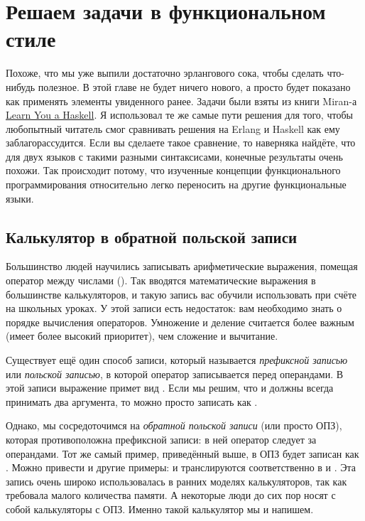 \chapter{Решаем задачи в функциональном стиле}
\label{functionally-solving-problems}
\colorbox{lgray}
{
\begin{minipage}{1.0\linewidth}
    Похоже, что мы уже выпили достаточно эрлангового сока, чтобы сделать что\--нибудь полезное.
    В этой главе не будет ничего нового, а просто будет показано как применять элементы увиденного ранее.
    Задачи были взяты из книги Miran\--а \href{http://learnyouahaskell.com/functionally-solving-problems}{Learn You a Haskell}.
    Я использовал те же самые пути решения для того, чтобы любопытный читатель смог сравнивать решения на Erlang и Haskell как ему заблагорассудится.
    Если вы сделаете такое сравнение, то наверняка найдёте, что для двух языков с такими разными синтаксисами, конечные результаты очень похожи.
    Так происходит потому, что изученные концепции функционального программирования относительно легко переносить на другие функциональные языки.
\end{minipage}
}
\section{Калькулятор в обратной польской записи}
\label{reverse-polish-notation-calculator}
Большинство людей научились записывать арифметические выражения, помещая оператор между числами ().
Так вводятся математические выражения в большинстве калькуляторов, и такую запись вас обучили использовать при счёте на школьных уроках. 
У этой записи есть недостаток: вам необходимо знать о порядке вычисления операторов.
Умножение и деление считается более важным (имеет более высокий приоритет), чем сложение и вычитание.

Существует ещё один способ записи, который называется \emph{префиксной записью} или \emph{польской записью}, в которой оператор записывается перед операндами.
В этой записи выражение  примет вид .
Если мы решим, что \ops{+\strut}  и \ops{/\strut} должны всегда принимать два аргумента, то  можно просто записать как .

Однако, мы сосредоточимся на \emph{обратной польской записи} (или просто ОПЗ), которая противоположна префиксной записи: в ней оператор следует за операндами.
Тот же самый пример, приведённый выше, в ОПЗ будет записан как .
Можно привести и другие примеры:  и  транслируются соответственно в  и .
Эта запись очень широко использовалась в ранних моделях калькуляторов, так как требовала малого количества памяти.
А некоторые люди до сих пор носят с собой калькуляторы с ОПЗ.
Именно такой калькулятор мы и напишем.

